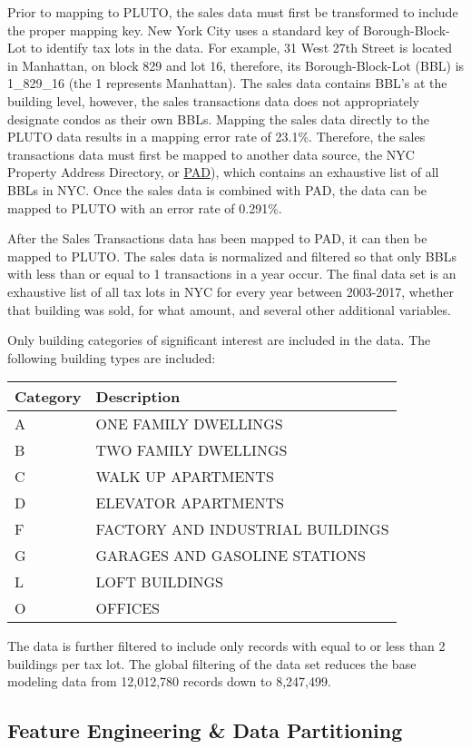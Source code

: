 \documentclass[]{article}
\begin{document}
Prior to mapping to PLUTO, the sales data must first be transformed to
include the proper mapping key. New York City uses a standard key of
Borough-Block-Lot to identify tax lots in the data. For example, 31 West
27th Street is located in Manhattan, on block 829 and lot 16, therefore,
its Borough-Block-Lot (BBL) is 1\_829\_16 (the 1 represents Manhattan).
The sales data contains BBL's at the building level, however, the sales
transactions data does not appropriately designate condos as their own
BBLs. Mapping the sales data directly to the PLUTO data results in a
mapping error rate of 23.1\%. Therefore, the sales transactions data
must first be mapped to another data source, the NYC Property Address
Directory, or
\href{https://data.cityofnewyork.us/City-Government/Property-Address-Directory/bc8t-ecyu/data}{PAD}),
which contains an exhaustive list of all BBLs in NYC. Once the sales
data is combined with PAD, the data can be mapped to PLUTO with an error
rate of 0.291\%.

After the Sales Transactions data has been mapped to PAD, it can then be
mapped to PLUTO. The sales data is normalized and filtered so that only
BBLs with less than or equal to 1 transactions in a year occur. The
final data set is an exhaustive list of all tax lots in NYC for every
year between 2003-2017, whether that building was sold, for what amount,
and several other additional variables.

Only building categories of significant interest are included in the
data. The following building types are included:

\begin{longtable}[]{@{}ll@{}}
\toprule
Category & Description\tabularnewline
\midrule
\endhead
A & ONE FAMILY DWELLINGS\tabularnewline
B & TWO FAMILY DWELLINGS\tabularnewline
C & WALK UP APARTMENTS\tabularnewline
D & ELEVATOR APARTMENTS\tabularnewline
F & FACTORY AND INDUSTRIAL BUILDINGS\tabularnewline
G & GARAGES AND GASOLINE STATIONS\tabularnewline
L & LOFT BUILDINGS\tabularnewline
O & OFFICES\tabularnewline
\bottomrule
\end{longtable}

The data is further filtered to include only records with equal to or
less than 2 buildings per tax lot. The global filtering of the data set
reduces the base modeling data from 12,012,780 records down to
8,247,499.

\subsection{Feature Engineering \& Data
Partitioning}\label{feature-engineering-data-partitioning}
\end{document}
